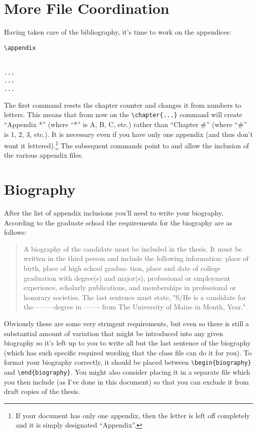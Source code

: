 \section{More File Coordination}

Having taken care of the bibliography, it's time to work on the appendices:

\begin{verbatim}
\appendix


...
...
...
\end{verbatim}

The first command resets the chapter counter and changes it from numbers to letters.  This means that from now on the \verb=\chapter{...}= command will create ``Appendix *'' (where ``*'' is A, B, C, etc.) rather than ``Chapter \#'' (where ``\#'' is 1, 2, 3, etc.).  It is necessary even if you have only one appendix (and thus don't want it lettered).\footnote{If your document has only one appendix, then the letter is left off completely and it is simply designated ``Appendix''.}  The subsequent commands point to and allow the inclusion of the various appendix files.

\section{Biography}\label{bio}
After the list of appendix inclusions you'll need to write your biography.  According to the graduate school the requirements for the biography are as follows:
\begin{quote}
A biography of the candidate must be included in the thesis.  It must  be written in the 
third person and include the following information:  place of birth, place of high school gradua- 
tion, place and date of college graduation with degree(s) and major(s), professional or 
employment experience, scholarly publications, and memberships in professional or honorary 
societies.  The last sentence must state, "S/He is a candidate for the---------degree in ------- from 
The University of Maine in Month, Year."
\end{quote}
Obviously these are some very stringent requirements, but even so there is still a substantial amount of variation that might be introduced into any given biography so it's left up to you to write all but the last sentence of the biography (which has such specific required wording that the class file can do it for you).  To format your biography correctly, it should be placed between \verb=\begin{biography}= and \verb=\end{biography}=.  You might also consider placing it in a separate file which you then include (as I've done in this document) so that you can exclude it from draft copies of the thesis.


